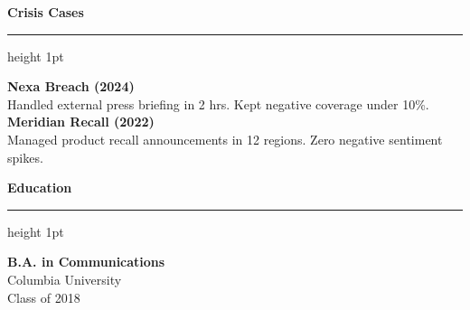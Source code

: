 \documentclass[10pt]{article}
\newcommand{\sidebartitle}[1]{%
  \vspace{0.15cm}%
  {\normalsize \bfseries \color{primary} #1}%
  \vspace{0.05cm}%
  {\color{secondary}\hrule height 1pt}%
  \vspace{0.08cm}%
}
\begin{document}
\begin{minipage}[t]{0.30\textwidth}
\begin{tcolorbox}[
    colback=lightbg,
    colframe=divider,
    arc=4pt,
    boxrule=1pt,
    top=6pt,
    bottom=6pt,
    left=6pt,
    right=6pt,
    boxsep=0pt,
    before=\vspace{0pt},
    after=\vspace{0pt}
  ]
    \sidebartitle{Crisis Cases}
    \textbf{Nexa Breach (2024)} \\
    {\small Handled external press briefing in 2 hrs. Kept negative coverage under 10\%.} \\[0.12cm]
    \textbf{Meridian Recall (2022)} \\
    {\small Managed product recall announcements in 12 regions. Zero negative sentiment spikes.}

    \sidebartitle{Education}
    \textbf{B.A. in Communications} \\
    {\small Columbia University} \\
    {\small Class of 2018}
  \end{tcolorbox}
\end{minipage}
\end{document}
